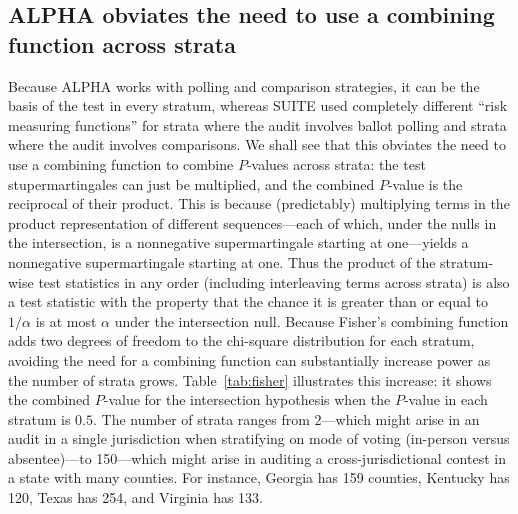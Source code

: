 \documentclass[aoas]{imsart}
\begin{document}
\subsection{ALPHA obviates the need to use a combining function across strata}
Because ALPHA works with polling and comparison strategies, it can be the basis of the test in every stratum,
whereas SUITE used completely different ``risk measuring functions'' for strata where the audit involves ballot polling and strata
where the audit involves comparisons.
We shall see that this obviates the need to use a combining function to combine $P$-values across
strata: the test stupermartingales can just be multiplied, and the combined $P$-value is the reciprocal of their product.
This is because (predictably) multiplying terms in the product representation of different sequences---each of which, under the nulls
in the intersection, is a nonnegative supermartingale
starting at one---yields a nonnegative supermartingale starting at one.
Thus the product of the stratum-wise test statistics in any order (including interleaving terms across strata) is also a test statistic 
with the property that the chance it is greater than or equal to $1/\alpha$ is at most $\alpha$ under the intersection null.
Because Fisher's combining function adds two degrees of freedom to the chi-square distribution for each stratum, avoiding 
the need for a combining function can substantially increase power as the number of strata grows.
Table~\ref{tab:fisher} illustrates this increase: it shows the combined $P$-value for the intersection hypothesis when the 
$P$-value in each
stratum is $0.5$. 
The number of strata ranges from $2$---which might arise in an audit in a single jurisdiction when
stratifying on mode of voting (in-person versus absentee)---to 150---which might arise in auditing a cross-jurisdictional
contest in a state with many counties.
For instance, Georgia has 159 counties, Kentucky has 120, Texas has 254, and Virginia has 133.
\end{document}
